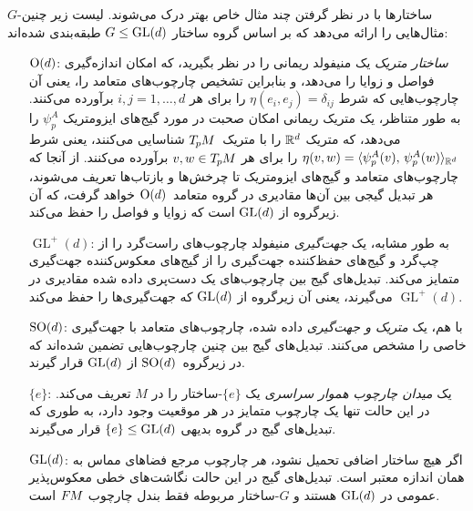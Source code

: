 $G$-ساختارها با در نظر گرفتن چند مثال خاص بهتر درک می‌شوند.
لیست زیر چنین مثال‌هایی را ارائه می‌دهد که بر اساس گروه ساختار $G \leq \operatorname{GL}(d)$ طبقه‌بندی شده‌اند:
\begin{itemize}[leftmargin=9.4ex]
	\item[$\operatorname{O}(d)$:]
	\emph{ساختار متریک} یک منیفولد ریمانی را در نظر بگیرید، که امکان اندازه‌گیری فواصل و زوایا را می‌دهد، و بنابراین تشخیص چارچوب‌های متعامد را، یعنی آن چارچوب‌هایی که شرط $\eta(e_i,e_j) = \delta_{ij}$ را برای هر $i,j=1,\dots,d$ برآورده می‌کنند.
	به طور متناظر، یک متریک ریمانی امکان صحبت در مورد گیج‌های ایزومتریک $\psi_p^A$ را می‌دهد، که متریک $\mathbb{R}^d$ را با متریک~$T_{\mkern-1.5mu p}\mkern-.5muM$ شناسایی می‌کنند، یعنی شرط $\eta(v,w) = \langle \psi_p^A(v),\, \psi_p^A(w) \rangle_{\mathbb{R}^d}$ را برای هر $v,w \in T_{\mkern-1.5mu p}\mkern-.5muM$ برآورده می‌کنند.
	از آنجا که چارچوب‌های متعامد و گیج‌های ایزومتریک تا چرخش‌ها و بازتاب‌ها تعریف می‌شوند، هر تبدیل گیجی بین آن‌ها مقادیری در گروه متعامد~$\operatorname{O}(d)$ خواهد گرفت، که آن زیرگروه از $\operatorname{GL}(d)$ است که زوایا و فواصل را حفظ می‌کند.
	\item[$\operatorname{GL}^+(d)$:]
	به طور مشابه، یک \emph{جهت‌گیری} منیفولد چارچوب‌های راست‌گرد را از چپ‌گرد و گیج‌های حفظ‌کننده جهت‌گیری را از گیج‌های معکوس‌کننده جهت‌گیری متمایز می‌کند.
	تبدیل‌های گیج بین چارچوب‌های یک دست‌پری داده شده مقادیری در $\operatorname{GL}^+(d)$ می‌گیرند، یعنی آن زیرگروه از $\operatorname{GL}(d)$ که جهت‌گیری‌ها را حفظ می‌کند.
	\item[$\operatorname{SO}(d)$:]
	با هم، یک \emph{متریک و جهت‌گیری} داده شده، چارچوب‌های متعامد با جهت‌گیری خاصی را مشخص می‌کنند.
	تبدیل‌های گیج بین چنین چارچوب‌هایی تضمین شده‌اند که در زیرگروه~$\operatorname{SO}(d)$ از $\operatorname{GL}(d)$ قرار گیرند.
	\item[$\{e\}$:]
	یک \emph{میدان چارچوب هموار سراسری} یک $\{e\}$-ساختار را در $M$ تعریف می‌کند.
	در این حالت تنها یک چارچوب متمایز در هر موقعیت وجود دارد، به طوری که تبدیل‌های گیج در گروه بدیهی ${\{e\} \leq \operatorname{GL}(d)}$ قرار می‌گیرند.
	\item[$\operatorname{GL}(d)$:]
	اگر هیچ ساختار اضافی تحمیل نشود، \emph{هر} چارچوب مرجع فضاهای مماس به همان اندازه معتبر است.
	تبدیل‌های گیج در این حالت نگاشت‌های خطی معکوس‌پذیر عمومی در $\operatorname{GL}(d)$ هستند و $G$-ساختار مربوطه فقط بندل چارچوب $F\mkern-1.5muM$ است.
\end{itemize}


